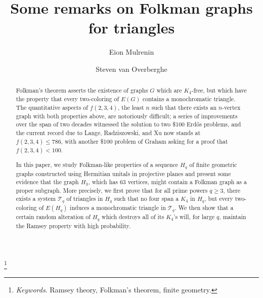 \documentclass[A4paper,reqno,oneside,12pt]{amsart}
\theoremstyle{plain}
\theoremstyle{definition}
\begin{document}

\title{Some remarks on Folkman graphs for triangles}

\author{Eion Mulrenin}
\address{Department of Mathematics, Emory University, Atlanta, GA, 30322, USA}

\author{Steven van Overberghe}
\address{Department of Mathematics, Computer Science, and Statistics, Ghent University, 9000 Ghent, Belgium}

\thanks{{\it Keywords}. Ramsey theory, Folkman's theorem, finite geometry.}


\begin{abstract}
    Folkman's theorem asserts the existence of graphs $G$ which are $K_4$-free, but which have the property that every two-coloring of $E(G)$ contains a monochromatic triangle.
    The quantitative aspects of $f(2,3,4)$, the least $n$ such that there exists an $n$-vertex graph with both properties above, are notoriously difficult;
    a series of improvements over the span of two decades witnessed the solution to two \$100 Erd\H{o}s problems, and the current record due to Lange, Radziszowski, and Xu now stands at $f(2,3,4) \leq 786$,
    with another \$100 problem of Graham asking for a proof that $f(2,3,4) < 100$.

    In this paper, we study Folkman-like properties of a sequence $H_q$ of finite geometric graphs constructed using Hermitian unitals in projective planes and present some evidence that the graph $H_3$, which has 63 vertices, might contain a Folkman graph as a proper subgraph. 
    More precisely, we first prove that for all prime powers $q \geq 3$, there exists a system $\mathscr{T}_q$ of triangles in $H_q$ such that no four span a $K_4$ in $H_q$, but every two-coloring of $E(H_q)$ induces a monochromatic triangle in $\mathscr{T}_q$.
    We then show that a certain random alteration of $H_q$ which destroys all of its $K_4$'s will, for large $q$, maintain the Ramsey property with high probability.
\end{abstract}

\maketitle

\end{document}

